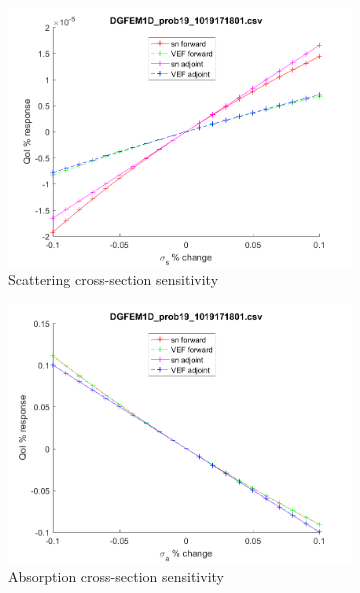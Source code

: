 \documentclass{article}
\begin{document}
\begin{figure}[H]
\begin{subfigure}{.5\textwidth}
  \includegraphics[width=.98\linewidth]{IanProposal/figures2/19sigsSens.png}
  \caption{Scattering cross-section sensitivity}
  \label{fig:sfig2}
\end{subfigure}%
\begin{subfigure}{.5\textwidth}
  \centering
  \includegraphics[width=.98\linewidth]{IanProposal/figures2/19sigaSens.png}
  \caption{Absorption cross-section sensitivity}
  \label{fig:sfig5}
\end{subfigure}%
\caption{}
\label{fig:fig}
\end{figure}
\newpage

\end{document}
